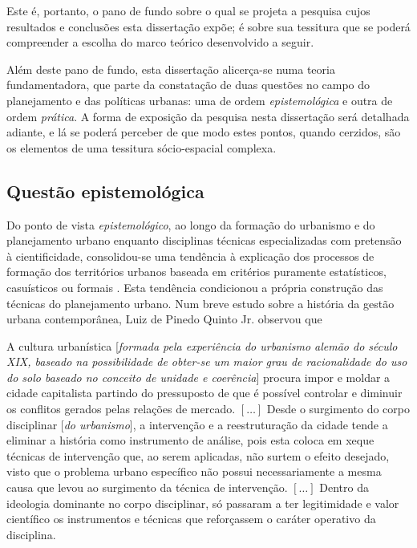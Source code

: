 Este é, portanto, o pano de fundo sobre o qual se projeta a pesquisa cujos resultados e conclusões esta dissertação expõe; é sobre sua tessitura que se poderá compreender a escolha do marco teórico desenvolvido a seguir.

Além deste pano de fundo, esta dissertação alicerça-se numa teoria fundamentadora, que parte da constatação de duas questões no campo do planejamento e das políticas urbanas: uma de ordem \textit{epistemológica} e outra de ordem \textit{prática}. A forma de exposição da pesquisa nesta dissertação será detalhada adiante, e lá se poderá perceber de que modo estes pontos, quando cerzidos, são os elementos de uma tessitura sócio-espacial complexa.

\subsection[Questão epistemológica]{Questão epistemológica}
\label{subsec:questepist}

Do ponto de vista \textit{epistemológico}, ao longo da formação do urbanismo e do planejamento urbano enquanto disciplinas técnicas especializadas com pretensão à cientificidade, consolidou-se uma tendência à explicação dos processos de formação dos territórios urbanos baseada em critérios puramente estatísticos, casuísticos ou formais \cite{benevolo_historia_1983, mumford_cidade_1998, hall_cidades_2007}. Esta tendência condicionou a própria construção das técnicas do planejamento urbano. Num breve estudo sobre a história da gestão urbana contemporânea, Luiz de Pinedo Quinto Jr. observou que 

\begin{citacao}
A cultura urbanística [\textit{formada pela experiência do urbanismo alemão do século XIX, baseado na possibilidade de obter-se um maior grau de racionalidade do uso do solo baseado no conceito de unidade e coerência}] procura impor e moldar a cidade capitalista partindo do pressuposto de que é possível controlar e diminuir os conflitos gerados pelas relações de mercado. \([\dots]\) Desde o surgimento do corpo disciplinar [\textit{do urbanismo}], a intervenção e a reestruturação da cidade tende a eliminar a história como instrumento de análise, pois esta coloca em xeque técnicas de intervenção que, ao serem aplicadas, não surtem o efeito desejado, visto que o problema urbano específico não possui necessariamente a mesma causa que levou ao surgimento da técnica de intervenção. \([\dots]\) Dentro da ideologia dominante no corpo disciplinar, só passaram a ter legitimidade e valor científico os instrumentos e técnicas que reforçassem o caráter operativo da disciplina. \cite{QUINTOJR1990}
\end{citacao}

